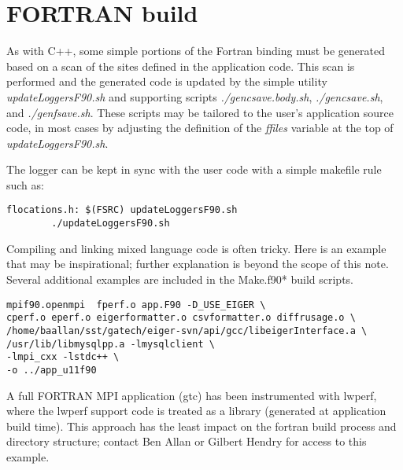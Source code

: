 \section{FORTRAN build}
\label{sec:fbuild}
As with C++, some simple portions of the Fortran binding must be generated based on a scan of the sites defined in the application code. This scan is performed and the generated code is updated by the simple utility {\em updateLoggersF90.sh} and supporting scripts {\em ./gencsave.body.sh}, {\em ./gencsave.sh}, and {\em ./genfsave.sh}. These scripts may be tailored to the user's application source code, in most cases by adjusting the definition of the {\em ffiles} variable at the top of {\em updateLoggersF90.sh}.

The logger can be kept in sync with the user code with a simple makefile rule such as:
\begin{verbatim}
flocations.h: $(FSRC) updateLoggersF90.sh
        ./updateLoggersF90.sh
\end{verbatim}

Compiling and linking mixed language code is often tricky. Here is an example that may be inspirational; further explanation is beyond the scope of this note. Several additional examples are included in the Make.f90* build scripts.

\begin{verbatim}
mpif90.openmpi  fperf.o app.F90 -D_USE_EIGER \
cperf.o eperf.o eigerformatter.o csvformatter.o diffrusage.o \
/home/baallan/sst/gatech/eiger-svn/api/gcc/libeigerInterface.a \
/usr/lib/libmysqlpp.a -lmysqlclient \
-lmpi_cxx -lstdc++ \
-o ../app_u11f90
\end{verbatim}

A full FORTRAN MPI application (gtc) has been instrumented with lwperf, where the lwperf support code is treated as a library (generated at application build time). This approach has the least impact on the fortran build process and directory structure; contact Ben Allan or Gilbert Hendry for access to this example.


